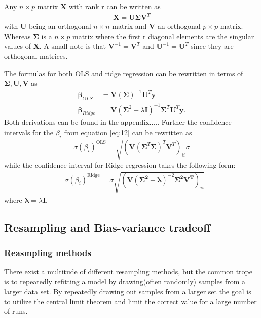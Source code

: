\documentclass[uio,jmp,amsmath,amssymb,reprint,nofootinbib]{revtex4-1}
\numberwithin{equation}{section}
\newcommand{\lp}{\left(}
\newcommand{\rp}{\right)}
\begin{document}
Any \(n\times p\) matrix \(\bm{X}\) with rank r can be written as
\begin{align}
\bm{X} = \bm{U\Sigma V}^T
\end{align}
with \(\bm{U}\) being an orthogonal \({n\times n}\) matrix and \(\bm{V}\) an orthogonal \({p\times p}\) matrix. Whereas \(\bm{\Sigma}\) is a \(n\times p\) matrix where the first r diagonal elements are the singular values of \(\bm{X}\). A small note is that \(\bm{V}^{-1} = \bm{V}^T\) and \(\bm{U}^{-1} = \bm{U}^T\) since they are orthogonal matrices\cite{MHJ_LinReg}.

The formulas for both OLS and ridge regression can be rewritten in terms of \(\bm{\Sigma, U, V}\) as
\begin{align}\label{eq:08}
\bm{\beta}_{OLS} &= \bm{V}(\bm{\Sigma})^{-1}\bm{U}^T\bm{y}\\ \label{eq:09}
\bm{\beta}_{Ridge} &= \bm{V}(\bm{\Sigma}^2 + \lambda\bm{I})^{-1}\bm{\Sigma}^T\bm{U}^T\bm{y}.
\end{align}
Both derivations can be found in the appendix..... Further the confidence intervals for the \(\beta_i\) from equation \ref{eq:12} can be rewritten as
\begin{equation}\label{eq:13}
\sigma(\beta_i)^{\text{OLS}} =\sqrt{ \lp\bm{V}\lp\bm{\Sigma}^T\bm{\Sigma}\rp^{T}\bm{V}^T\rp_{ii}}\sigma
\end{equation}
while the confidence interval for Ridge regression takes the following form:
\begin{align}\label{eq:14}
&\sigma(\beta_i)^{\text{Ridge}} = \sigma \sqrt{ \lp\bm{V}\lp \bm{\Sigma^2 + \lambda}\rp^{-2}\bm{\Sigma^2}\bm{V^T}\rp_{ii}}
\end{align}
where \(\bm{\lambda} = \lambda\bm{I}\).


\subsection{Resampling and Bias-variance tradeoff}

\subsubsection{Reasmpling methods}

There exist a multitude of different resampling methods, but the common trope is to repeatedly refitting a model by drawing(often randomly) samples from a larger data set. By repeatedly drawing out samples from a larger set the goal is to utilize the central limit theorem and limit the correct value for a large number of runs.  
\end{document}
